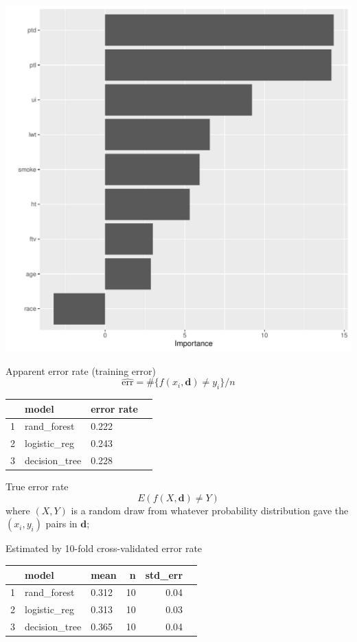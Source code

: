 \begin{frame}[fragile]\frametitle{}

\centering
\includegraphics[scale=.45]{images/rf_vip}

\end{frame}
\begin{frame}[fragile]

Apparent error rate (training error)
$$\widehat{\textrm{err}} = \#\{ f(x_i, \mathbf{d}) \neq y_i\} / n$$

\begin{tabular}{rllr}
  \hline
 & model &  error rate \\ 
  \hline
1 & rand\_forest &0.222  \\ 
  2 & logistic\_reg & 0.243  \\ 
  3 & decision\_tree  &0.228 \\ 
   \hline
\end{tabular}

True error rate
$$E(f(X, \mathbf{d}) \neq Y)$$
where $(X, Y)$ is a random draw from whatever probability
distribution gave the $(x_i, y_i)$ pairs in $\mathbf{d}$;

Estimated by 10-fold cross-validated error rate

\begin{tabular}{rllrrr}
  \hline
 & model  & mean & n & std\_err \\ 
  \hline
1 & rand\_forest  & 0.312 &  10 & 0.04 \\ 
  2 & logistic\_reg  & 0.313 &  10 & 0.03 \\ 
  3 & decision\_tree  & 0.365 &  10 & 0.04 \\ 
   \hline
\end{tabular}

\end{frame}

